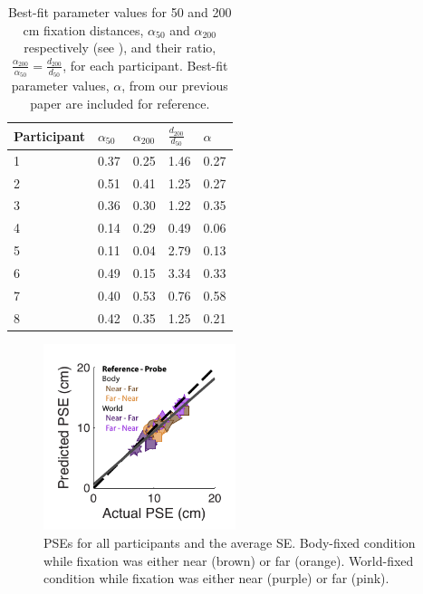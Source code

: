 \begin{table}
    \begin{tabular}{l|lll|l}
	Participant & $\alpha_{50}$ & $\alpha_{200}$ & $\frac{d_{200}}{d_{50}}$ & $\alpha$ \\
    \hline
	1 & 0.37 & 0.25 & 1.46 & 0.27 \\
	2 & 0.51 & 0.41 & 1.25 & 0.27 \\
	3 & 0.36 & 0.30 & 1.22 & 0.35 \\
	4 & 0.14 & 0.29 & 0.49 & 0.06 \\
	5 & 0.11 & 0.04 & 2.79 & 0.13 \\
	6 & 0.49 & 0.15 & 3.34 & 0.33\\
	7 & 0.40 & 0.53 & 0.76 & 0.58 \\
	8 & 0.42 & 0.35 & 1.25 & 0.21 \\
    \end{tabular}

    \caption{Best-fit parameter values for 50 and 200 \si{\centi\metre} fixation distances, $\alpha_{50}$ and $\alpha_{200}$ respectively (see ), and their ratio, $\frac{\alpha_{200}}{\alpha_{50}} = \frac{d_{200}}{d_{50}}$, for each participant. Best-fit parameter values, $\alpha$, from our previous paper \protect\cite{clemens2015a} are included for reference.}

    \label{p4:tab2}
\end{table}

\begin{figure}
    \includegraphics[width=0.5\textwidth]{src/paper4/p4_figure4.pdf}

	\caption{PSEs for all participants and the average \textpm SE.   Body-fixed condition while fixation was either near (brown) or far (orange).  World-fixed condition while fixation was either near (purple) or far (pink).}
	\label{p4:fig4}
\end{figure}

